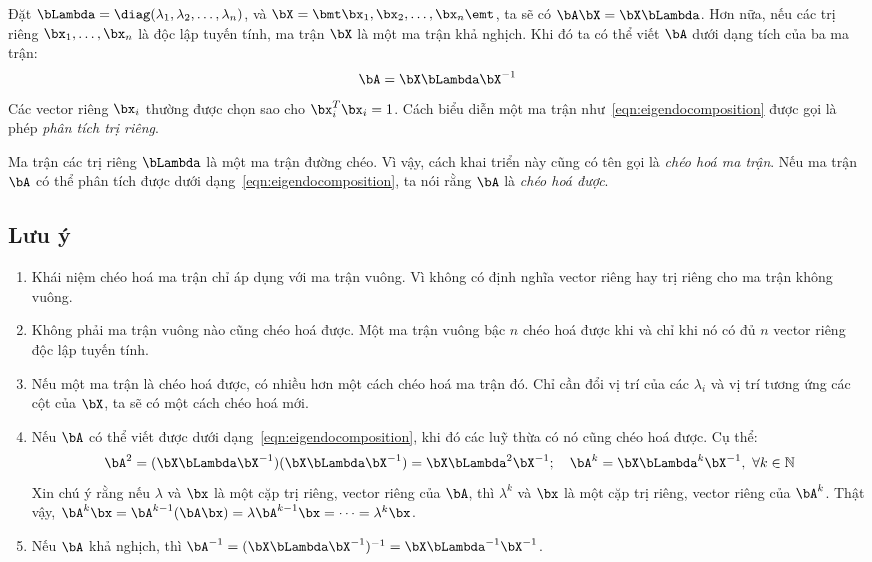 Đặt $\bLambda = \diag(\lambda_1, \lambda_2, \dots, \lambda_n)$, và
$\bX = \bmt \bx_1, \bx_2, \dots, \bx_n \emt$, ta sẽ có $\bA\bX = \bX\bLambda$.
Hơn nữa, nếu các trị riêng $\bx_1, \dots, \bx_n$ là độc lập tuyến tính, ma trận
$\bX$ là một ma trận khả nghịch. Khi đó ta có thể viết $\bA$ dưới dạng tích của
ba ma trận:
\begin{equation}
\label{eqn:eigendocomposition}
    \bA = \bX\bLambda\bX^{-1}
\end{equation}
Các vector riêng $\bx_i$ thường được chọn sao cho $\bx_i^T\bx_i = 1$. Cách biểu
diễn một ma trận như~\eqref{eqn:eigendocomposition} được gọi là phép
\textit{phân tích trị riêng}.

Ma trận các trị riêng $\bLambda$ là một ma trận đường chéo. Vì vậy, cách khai
triển này cũng có tên gọi là \textit{chéo hoá ma trận}. Nếu ma trận $\bA$ có thể
phân tích được dưới dạng~\eqref{eqn:eigendocomposition}, ta nói rằng $\bA$ là
\textit{chéo hoá được}.

\subsection{Lưu ý} %
\label{sub:luu y}

\begin{enumerate}

    \item Khái niệm chéo hoá ma trận chỉ áp dụng với ma trận vuông. Vì không có
    định nghĩa vector riêng hay trị riêng cho ma trận không vuông.

    \item Không phải ma trận vuông nào cũng chéo hoá được. Một ma trận
    vuông bậc $n$ chéo hoá được khi và chỉ khi nó có đủ $n$ vector riêng độc lập
    tuyến tính.

    \item Nếu một ma trận là chéo hoá được, có nhiều hơn một cách chéo hoá ma
    trận đó. Chỉ cần đổi vị trí của các $\lambda_i$ và vị trí tương ứng
    các cột của $\bX$, ta sẽ có một cách chéo hoá mới.

    \item Nếu $\bA$ có thể viết được dưới dạng~\eqref{eqn:eigendocomposition},
    khi đó các luỹ thừa có nó cũng chéo hoá được. Cụ thể:
    \begin{equation}
        \bA^2 = (\bX \bLambda \bX^{-1})(\bX \bLambda \bX^{-1}) =
        \bX\bLambda^2\bX^{-1}; \quad \bA^k = \bX \bLambda^k \bX^{-1}, ~\forall k \in
        \mathbb{N}
    \end{equation}
    Xin chú ý rằng nếu $\lambda$ và $\bx$ là một cặp trị riêng, vector riêng
    của $\bA$, thì $\lambda^k$ và $\bx$ là một cặp  trị riêng, vector riêng
    của $\bA^k$. Thật vậy, $\bA^k \bx = \bA^{k-1}(\bA\bx) = \lambda \bA^
    {k-1}\bx = \dots = \lambda^k \bx$.

    \item Nếu $\bA$ khả nghịch, thì $\bA^{-1} = (\bX \bLambda \bX^{-1})^{-1} =
    \bX \bLambda^{-1}\bX^{-1}$. 
\end{enumerate}

